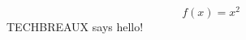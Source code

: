 \documentclass[a4paper,12pt]{article}
\begin{document}
\begin{equation}
f(x) = x^2
\end{equation}
TECHBREAUX says hello!
\end{document}
